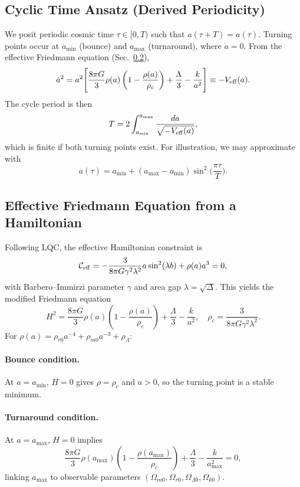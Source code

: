 \documentclass[12pt]{article}
\begin{document}
\subsection{Cyclic Time Ansatz (Derived Periodicity)}
We posit periodic cosmic time $\tau \in [0,T)$ such that $a(\tau+T)=a(\tau)$. Turning points
occur at $a_{\min}$ (bounce) and $a_{\max}$ (turnaround), where $\dot a=0$.
From the effective Friedmann equation (Sec.~\ref{sec:effFriedmann}),
\begin{equation}
\dot a^2 = a^2\Bigg[\frac{8\pi G}{3}\rho(a)\left(1-\frac{\rho(a)}{\rho_c}\right)+\frac{\Lambda}{3}-\frac{k}{a^2}\Bigg]
\equiv -V_{\rm eff}(a).
\end{equation}
The cycle period is then
\begin{equation}
T = 2\int_{a_{\min}}^{a_{\max}}\frac{da}{\sqrt{-V_{\rm eff}(a)}},
\end{equation}
which is finite if both turning points exist. For illustration, we may approximate with
\begin{equation}
a(\tau) = a_{\min}+(a_{\max}-a_{\min})\sin^2\!\Big(\frac{\pi \tau}{T}\Big).
\end{equation}

\subsection{Effective Friedmann Equation from a Hamiltonian}
\label{sec:effFriedmann}
Following LQC, the effective Hamiltonian constraint is
\begin{equation}
\mathcal{C}_{\rm eff}=-\frac{3}{8\pi G\gamma^2\lambda^2}a\sin^2(\lambda b)+\rho(a)a^3=0,
\end{equation}
with Barbero--Immirzi parameter $\gamma$ and area gap $\lambda=\sqrt{\Delta}$.
This yields the modified Friedmann equation
\begin{equation}
H^2=\frac{8\pi G}{3}\rho(a)\left(1-\frac{\rho(a)}{\rho_c}\right)+\frac{\Lambda}{3}-\frac{k}{a^2},
\quad \rho_c=\frac{3}{8\pi G\gamma^2\lambda^2}.
\end{equation}
For $\rho(a)=\rho_{r0}a^{-4}+\rho_{m0}a^{-3}+\rho_\Lambda$:

\paragraph{Bounce condition.} At $a=a_{\min}$, $H=0$ gives $\rho=\rho_c$ and $\ddot a>0$, 
so the turning point is a stable minimum.

\paragraph{Turnaround condition.} At $a=a_{\max}$, $H=0$ implies
\begin{equation}
\frac{8\pi G}{3}\rho(a_{\max})\left(1-\frac{\rho(a_{\max})}{\rho_c}\right)+\frac{\Lambda}{3}-\frac{k}{a_{\max}^2}=0,
\end{equation}
linking $a_{\max}$ to observable parameters $(\Omega_{m0},\Omega_{r0},\Omega_{\Lambda0},\Omega_{k0})$.
\end{document}
